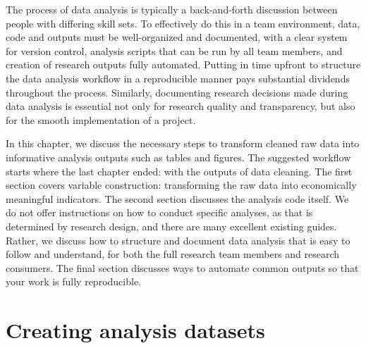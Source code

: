 
\begin{fullwidth}



The process of data analysis is typically
a back-and-forth discussion between people
with differing skill sets.
To effectively do this in a team environment,
data, code and outputs must be well-organized and documented,
with a clear system for version control,
analysis scripts that can be run by all team members,
and creation of research outputs fully automated.
Putting in time upfront to structure the data analysis workflow
in a reproducible manner pays substantial dividends throughout the process.
Similarly, documenting research decisions made during data analysis 
is essential not only for research quality and transparency,
but also for the smooth implementation of a project.

In this chapter, we discuss the necessary steps to transform
cleaned raw data into informative analysis outputs such as tables and figures.
The suggested workflow starts where the last chapter ended:
with the outputs of data cleaning.
The first section covers variable construction:
transforming the raw data into economically meaningful indicators.
The second section discusses the analysis code itself.
We do not offer instructions on how to conduct specific analyses,
as that is determined by research design,
and there are many excellent existing guides.
Rather, we discuss how to structure and document data analysis
that is easy to follow and understand,
for both the full research team members and research consumers.
The final section discusses ways to automate common outputs
so that your work is fully reproducible.

\end{fullwidth}


\section{Creating analysis datasets}

